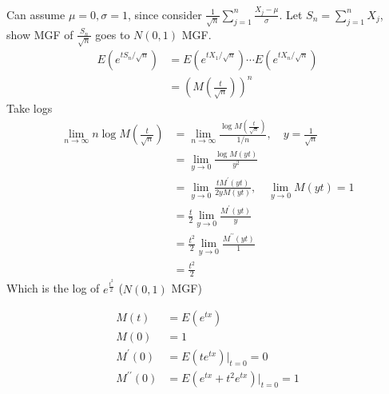 \documentclass{oblivoir}
\begin{document}
\begin{itemize}
\begin{enumerate}
Can assume $\mu = 0, \sigma = 1$, since consider $\displaystyle \frac{1}{\sqrt{n}} \sum_{j=1}^n \frac{X_j - \mu}{\sigma}$. Let $S_n = \sum_{j=1}^n X_j$, show MGF of 
$\frac{S_n}{\sqrt{n}}$ goes to $N(0,1)$ MGF.
\begin{align*}
E\left(e^{t S_n / \sqrt{n}} \right) &= E\left(e^{t X_1 / \sqrt{n}} \right) \cdots E\left(e^{t X_n / \sqrt{n}} \right) \\
&= \left(M\left(\frac{t}{\sqrt{n}} \right) \right)^n
\end{align*}
Take logs
\begin{align*}
\lim_{n \rightarrow \infty} n \log M\left( \frac{t}{\sqrt{n}} \right) &= \lim_{n \rightarrow \infty} \frac{\log M\left( \frac{t}{\sqrt{n}} \right)}{1/n}, \quad y = \frac{1}{\sqrt{n}} \\
&= \lim_{y \rightarrow 0} \frac{\log M\left( yt\right)}{y^2} \\
&= \lim_{y \rightarrow 0} \frac{t M^{\prime}(yt)}{2yM(yt)} , \quad \lim_{y \rightarrow 0} M(yt) = 1 \\
&= \frac{t}{2} \lim_{y \rightarrow 0} \frac{M^{\prime}(yt)}{y}  \\
&= \frac{t^2}{2} \lim_{y \rightarrow 0} \frac{M^{\prime\prime}(yt)}{1} \\
&= \frac{t^2}{2}
\end{align*}
Which is the log of $e^{\frac{t^2}{2}}$ ($N(0,1)$ MGF)
\begin{myframe}{}
\begin{align*}
M(t) &= E(e^{tx}) \\
M(0) &= 1 \\
M^{\prime}(0) &= E(t e^{tx})|_{t=0} = 0 \\
M^{\prime\prime}(0) &= E(e^{tx} + t^2 e^{tx})|_{t=0} = 1
\end{align*}
\end{myframe}
\end{enumerate}
\end{itemize}
\end{document}
